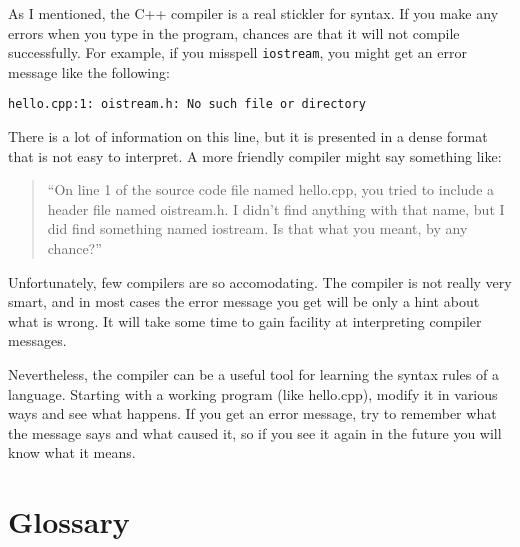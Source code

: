 As I mentioned, the C++ compiler is a real stickler for syntax.
If you make any errors when you type in the program, chances
are that it will not compile successfully.  For example, if
you misspell {\tt iostream}, you might get an error message like
the following:

\begin{verbatim}
hello.cpp:1: oistream.h: No such file or directory
\end{verbatim}

There is a lot of information on this line, but it is presented
in a dense format that is not easy to interpret.  A more friendly
compiler might say something like:

\begin{quote}
``On line 1 of the source code file named hello.cpp, you tried to
include a header file named oistream.h.  I didn't find anything
with that name, but I did find something named iostream.  Is
that what you meant, by any chance?''
\end{quote}

Unfortunately, few compilers are so accomodating.  The compiler
is not really very smart, and in most cases the error message
you get will be only a hint about what is wrong.  It will take
some time to gain facility at interpreting compiler messages.

Nevertheless, the compiler can be a useful tool for learning the
syntax rules of a language.  Starting with a working program
(like hello.cpp), modify it in various ways and see what happens.
If you get an error message, try to remember what the message says
and what caused it, so if you see it again in the future you
will know what it means.

\section{Glossary}

